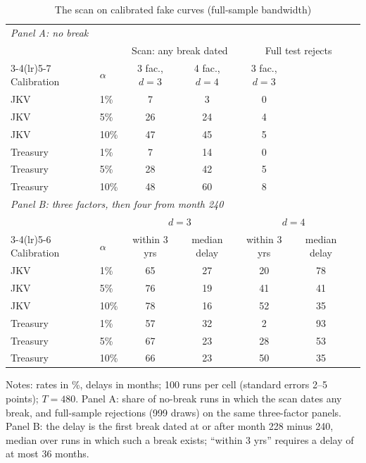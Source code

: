 \documentclass[11pt]{article}
\begin{document}
\begin{table}[htbp]
\centering
\begin{threeparttable}
\small
\caption{The scan on calibrated fake curves (full-sample bandwidth)}\label{tab.scansim}
\begin{tabular}{llccccc}
\toprule
\multicolumn{7}{l}{\emph{Panel A: no break}}\\
 & & \multicolumn{2}{c}{Scan: any break dated} & \multicolumn{3}{c}{Full test rejects}\\
\cmidrule(lr){3-4}\cmidrule(lr){5-7}
Calibration & $\alpha$ & 3 fac., $d=3$ & 4 fac., $d=4$ & 3 fac., $d=3$ & & \\
\midrule
JKV & 1\% & 7 & 3 & 0 & & \\
JKV & 5\% & 26 & 24 & 4 & & \\
JKV & 10\% & 47 & 45 & 5 & & \\
Treasury & 1\% & 7 & 14 & 0 & & \\
Treasury & 5\% & 28 & 42 & 5 & & \\
Treasury & 10\% & 48 & 60 & 8 & & \\
\midrule
\multicolumn{7}{l}{\emph{Panel B: three factors, then four from month 240}}\\
 & & \multicolumn{2}{c}{$d=3$} & \multicolumn{2}{c}{$d=4$} & \\
\cmidrule(lr){3-4}\cmidrule(lr){5-6}
Calibration & $\alpha$ & within 3 yrs & median delay & within 3 yrs & median delay & \\
\midrule
JKV & 1\% & 65 & 27 & 20 & 78 & \\
JKV & 5\% & 76 & 19 & 41 & 41 & \\
JKV & 10\% & 78 & 16 & 52 & 35 & \\
Treasury & 1\% & 57 & 32 & 2 & 93 & \\
Treasury & 5\% & 67 & 23 & 28 & 53 & \\
Treasury & 10\% & 66 & 23 & 50 & 35 & \\
\bottomrule
\end{tabular}
\begin{tablenotes}\small
\item Notes: rates in \%, delays in months; 100 runs per cell (standard errors 2--5 points); $T=480$. Panel A: share of no-break runs in which the scan dates any break, and full-sample rejections (999 draws) on the same three-factor panels. Panel B: the delay is the first break dated at or after month 228 minus 240, median over runs in which such a break exists; ``within 3 yrs'' requires a delay of at most 36 months.
\end{tablenotes}
\end{threeparttable}
\end{table}
\end{document}
